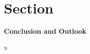 
\section[Conclusion and Outlook]{\fontsize{\customSecFontSize}{55}\selectfont Section }
	\vspace{\customSecPreDist}
	\begin{flushleft}
		{\fontsize{\customSecFontSizeAdd}{\customSecLineDistAdd}\selectfont\bfseries Conclusion and Outlook\par}
	\end{flushleft}
	\vspace{\customSecPostDist}
	\label{sec:sec4.conclusion_and_outlook}

	\vspace{\dropCapSecVertDist}\lettrine{\color{\lettrineDropCapFontColor}{I}}{n} \blindtext[3]

